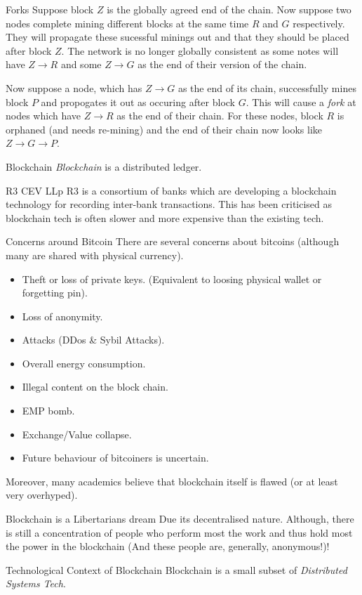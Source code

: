 \documentclass[11pt,a4paper]{article}
\begin{document}
\begin{remark}{Forks}
  Suppose block $Z$ is the globally agreed end of the chain. Now suppose two nodes complete mining different blocks at the same time $R$ and $G$ respectively. They will propagate these sucessful minings out and that they should be placed after block $Z$. The network is no longer globally consistent as some notes will have $Z\to R$ and some $Z\to G$ as the end of their version of the chain.
  \par Now suppose a node, which has $Z\to G$ as the end of its chain, successfully mines block $P$ and propogates it out as occuring after block $G$. This will cause a \textit{fork} at nodes which have $Z\to R$ as the end of their chain. For these nodes, block $R$ is orphaned (and needs re-mining) and the end of their chain now looks like $Z\to G\to P$.
\end{remark}

\begin{definition}{Blockchain}
  \textit{Blockchain} is a distributed ledger.
\end{definition}

\begin{remark}{R3 CEV LLp}
  R3 is a consortium of banks which are developing a blockchain technology for recording inter-bank transactions. This has been criticised as blockchain tech is often slower and more expensive than the existing tech.
\end{remark}

\begin{remark}{Concerns around Bitcoin}
  There are several concerns about bitcoins (although many are shared with physical currency).
  \begin{itemize}
    \item Theft or loss of private keys. (Equivalent to loosing physical wallet or forgetting pin).
    \item Loss of anonymity.
    \item Attacks (DDos \& Sybil Attacks).
    \item Overall energy consumption.
    \item Illegal content on the block chain.
    \item EMP bomb.
    \item Exchange/Value collapse.
    \item Future behaviour of bitcoiners is uncertain.
  \end{itemize}
  Moreover, many academics believe that blockchain itself is flawed (or at least very overhyped).
\end{remark}

\begin{remark}{Blockchain is a Libertarians dream}
  Due its decentralised nature. Although, there is still a concentration of people who perform most the work and thus hold most the power in the blockchain (And these people are, generally, anonymous!)!
\end{remark}

\begin{proposition}{Technological Context of Blockchain}
  Blockchain is a small subset of \textit{Distributed Systems Tech}.
\end{proposition}
\end{document}
